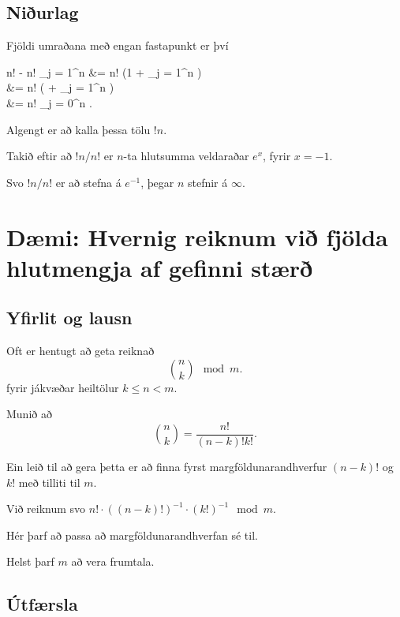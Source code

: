 \subsection{Niðurlag}
{
    {
        \item<1-> Fjöldi umraðana með engan fastapunkt er því
    }
    {
        n! - n! \sum_{j = 1}^n  
        &= n! \left (1 + \sum_{j = 1}^n  \right )\\
        &= n! \left ( + \sum_{j = 1}^n  \right )\\
        &= n! \sum_{j = 0}^n .
    }
    {
        \item<2-> Algengt er að kalla þessa tölu $!n$.
        \item<3-> Takið eftir að $!n/n!$ er $n$-ta hlutsumma veldaraðar $e^x$, fyrir $x = -1$.
        \item<4-> Svo $!n/n!$ er að stefna á $e^{-1}$, þegar $n$ stefnir á $\infty$.
    }
}

\section{Dæmi: Hvernig reiknum við fjölda hlutmengja af gefinni stærð}
\subsection{Yfirlit og lausn}
{
    {
        \item<1-> Oft er hentugt að geta reiknað
        \[
            {n \choose k} \mod m.
        \]
        fyrir jákvæðar heiltölur $k \leq n < m$.
        \item<2-> Munið að
        \[
            {n \choose k} = \frac{n!}{(n - k)!k!}.
        \]
        \item<3-> Ein leið til að gera þetta er að finna fyrst margföldunarandhverfur $(n - k)!$ og $k!$ með tilliti til $m$.
        \item<4-> Við reiknum svo $n! \cdot ((n - k)!)^{-1} \cdot (k!)^{-1} \mod m$.
        \item<5-> Hér þarf að passa að margföldunarandhverfan sé til.
        \item<6-> Helst þarf $m$ að vera frumtala.
    }
}

\subsection{Útfærsla}
{
}

